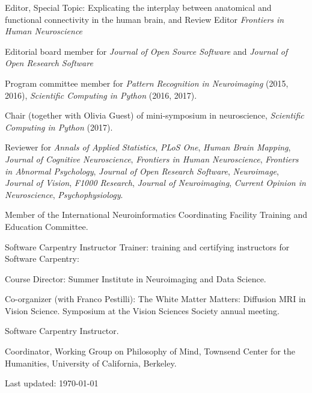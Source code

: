 \documentclass[11pt,fullpage]{article}
\newcommand{\years}[1]{\marginnote{\scriptsize #1}} %
\begin{document}
Editor, Special Topic: Explicating the interplay between anatomical and functional connectivity in the human brain, and Review Editor \emph{Frontiers in Human Neuroscience}

\vspace{4pt}

Editorial board member for \emph{Journal of Open Source Software} and \emph{Journal of Open Research Software}

Program committee member for \emph{Pattern Recognition in Neuroimaging} (2015, 2016), \emph{Scientific Computing in Python} (2016, 2017).

\vspace{4pt}

Chair (together with Olivia Guest) of mini-symposium in neuroscience,
\emph{Scientific Computing in Python} (2017).

\vspace{4pt}

Reviewer for \emph{Annals of Applied Statistics}, \emph{PLoS One}, \emph{Human Brain Mapping}, \emph{Journal of Cognitive Neuroscience}, \emph{Frontiers in Human Neuroscience}, \emph{Frontiers in Abnormal Psychology}, \emph{Journal of Open Research Software}, \emph{Neuroimage}, \emph{Journal of Vision}, \emph{F1000 Research}, \emph{Journal of Neuroimaging}, \emph{Current Opinion in Neuroscience}, \emph{Psychophysiology}.

\vspace{4pt}

\years{2017 --} Member of the International Neuroinformatics Coordinating Facility Training and Education Committee.

\years{2016 -- } Software Carpentry Instructor Trainer: training and certifying instructors for Software Carpentry:

\years{2016 --} Course Director: Summer Institute in Neuroimaging and Data Science.

\years{2014} Co-organizer (with Franco Pestilli): The White Matter Matters: Diffusion MRI in Vision Science. Symposium at the Vision Sciences Society annual meeting.

\years{2012 --}  Software Carpentry Instructor.

\years{2007 - 2008} Coordinator, Working Group on Philosophy of Mind, Townsend Center for the Humanities, University of California, Berkeley.

\bigskip
\begin{center}
  \begin{footnotesize}
    Last updated: \today
  \end{footnotesize}
\end{center}

\end{document}
